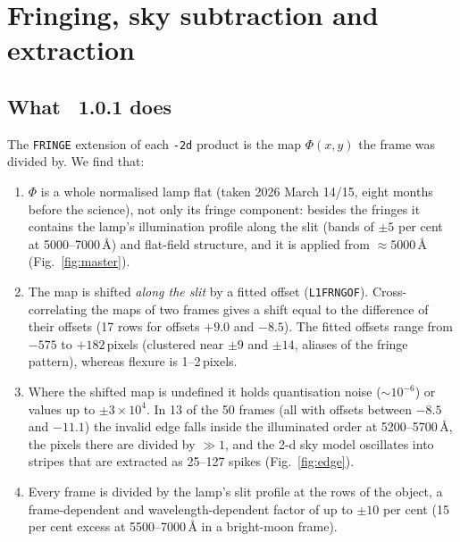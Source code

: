 \section{Fringing, sky subtraction and extraction}
\label{sec:fringe}

\subsection{What \banzai{}~1.0.1 does}
\label{sec:fringe_banzai}
The \texttt{FRINGE} extension of each \texttt{-2d} product is the map $\Phi(x,y)$ the frame was divided by. We find
that:
\begin{enumerate}
\item $\Phi$ is a whole normalised lamp flat (taken 2026 March 14/15, eight months before the science), not only its
fringe component: besides the fringes it contains the lamp's illumination profile along the slit (bands of
$\pm5$ per cent at 5000--7000\,\AA) and flat-field structure, and it is applied from $\approx5000$\,\AA{}
(Fig.~\ref{fig:master}).
\item The map is shifted \emph{along the slit} by a fitted offset (\texttt{L1FRNGOF}). Cross-correlating the maps
of two frames gives a shift equal to the difference of their offsets (17 rows for offsets $+9.0$ and $-8.5$). The
fitted offsets range from $-575$ to $+182$\,pixels (clustered near $\pm9$ and $\pm14$, aliases of the fringe
pattern), whereas flexure is 1--2\,pixels.
\item Where the shifted map is undefined it holds quantisation noise ($\sim10^{-6}$) or values up to $\pm3\times10^4$.
In 13 of the 50 frames (all with offsets between $-8.5$ and $-11.1$) the invalid edge falls inside the illuminated
order at 5200--5700\,\AA{}, the pixels there are divided by $\gg1$, and the 2-d sky model oscillates into stripes
that are extracted as 25--127 spikes (Fig.~\ref{fig:edge}).
\item Every frame is divided by the lamp's slit profile at the rows of the object, a frame-dependent and
wavelength-dependent factor of up to $\pm10$ per cent (15 per cent excess at 5500--7000\,\AA{} in a bright-moon frame).
\end{enumerate}

